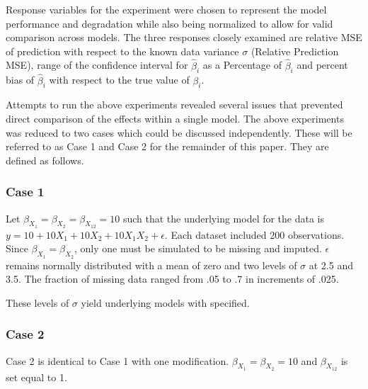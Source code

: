 \documentclass[../../paper.tex]{subfiles}
\begin{document}
Response variables for the experiment were chosen to represent the model performance
and degradation while also being normalized to allow for valid comparison across
models. The three responses closely examined are relative MSE of prediction
with respect to the known data variance $\sigma$ (Relative Prediction MSE), range of the confidence interval for $\hat{\beta}_{i}$ as a Percentage of $\hat{\beta}_{i}$
and percent bias of $\hat{\beta}_{i}$ with respect to the true value of $\beta_{i}$.

Attempts to run the above experiments revealed several issues that prevented direct comparison of the effects within a single model.
The above experiments was reduced to two cases which could be discussed independently.
These will be referred to as Case 1 and Case 2 for the remainder of this paper.
They are defined as follows.

\subsubsection{Case 1}
Let $\beta_{ X_{1}} = \beta_{ X_{2}} = \beta_{ X_{12}} = 10$ such that the underlying model for the data is $y = 10 + 10X_{1} + 10X_{2} + 10X_{1}X_{2} + \epsilon $.
Each dataset included 200 observations.
Since $\beta_{ X_{1}} = \beta_{ X_{2}}$, only one must be simulated to be missing and imputed.
$\epsilon $ remains normally distributed with a mean of zero and two levels of $\sigma$ at 2.5 and 3.5. The fraction of missing data ranged from .05 to .7 in increments of .025.

These levels of $\sigma$ yield underlying models with specified.

\subsubsection{Case 2}

Case 2 is identical to Case 1 with one modification. $\beta_{ X_{1}} = \beta_{ X_{2}} = 10$ and $\beta_{ X_{12}}$ is set equal to 1.


\end{document}
